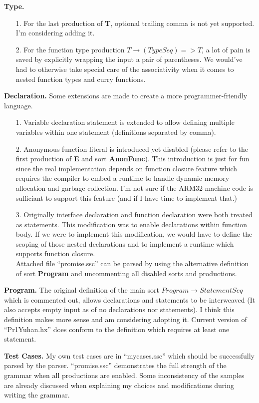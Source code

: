 \documentclass[12pt]{article}
\begin{document}
\vspace{4mm}
{\bf Type.}
\begin{itemize}
\item[1.] For the last production of {\bf T}, optional trailing comma is not yet supported. I'm
considering adding it.
\item[2.] For the function type production $T \rightarrow (TypeSeq)=>T$, a lot of pain is saved
by explicitly wrapping the input a pair of parentheses. We would've had to otherwise take special
care of the associativity when it comes to nested function types and curry functions.
\end{itemize}

\vspace{4mm}
{\bf Declaration.} Some extensions are made to create a more programmer-friendly language.

\begin{itemize}
\item[1.] Variable declaration statement is extended to allow defining multiple variables
  within one statement (definitions separated by comma).
\item[2.] Anonymous function literal is introduced yet disabled (please refer to the first production of {\bf E} and sort
  {\bf AnonFunc}). This introduction is just for fun since the real implementation depends on function
  closure feature which requires the compiler to embed a runtime to handle dynamic memory allocation
  and garbage collection. I'm not sure if the ARM32 machine code is sufficiant to support this feature
  (and if I have time to implement that.)
\item[3.] Originally interface declaration and function declaration were both treated as statements.
  This modification was to enable declarations within function body. If we were to implement this
  modification, we would have to define the scoping of those nested declarations and to implement
  a runtime which supports function closure.\\
  Attached file ``promise.ssc'' can be parsed by using the alternative definition of sort {\bf Program} and
  uncommenting all disabled sorts and productions.
\end{itemize}

\vspace{4mm}
{\bf Program.} The original definition of the main sort $Program \rightarrow StatementSeq$
which is commented out, allows declarations and statements to be interweaved (It also accepts
empty input as of no declarations nor statements). I think this definition makes more sense
and am considering adopting it. Current version of ``Pr1Yuhan.hx'' does conform to the definition
which requires at least one statement.

\vspace{4mm}
{\bf Test Cases.} My own test cases are in ``mycases.ssc'' which should be successfully parsed by the parser.
``promise.ssc'' demonstrates the full strength of the grammar when all productions are enabled. Some inconsistency
of the samples are already discussed when explaining my choices and modifications during writing the grammar.
\end{document}
